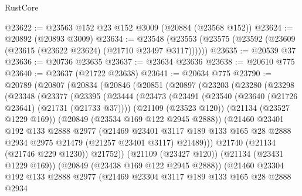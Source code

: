 \begin{lexlean}{RustCore}
\begin{coremodule}
@23622 := @23563 @152 @23 @152 @3009 (@20884 (@23568 @152))
@23624 := @20892 (@20893 @3009)
@23634 := @23548 (@23553 (@23575 (@23592 (@23609 (@23615 (@23622 @23624) (@21710 @23497 @3117))))))
@23635 := @20539 @37
@23636 := @20736 @23635
@23637 := @23634 @23636
@23638 := @20610 @775
@23640 := @23637 (@21722 @23638)
@23641 := @20634 @775
@23790 := @20789
    (@20807
      (@20834
        (@20846
          (@20851
            (@20897
              (@23203
                (@23280
                  (@23298
                    (@23348
                      (@23377
                        (@23395
                          (@23444
                            (@23473
                              (@23491
                                (@23540 (@23640 (@21726 @23641) (@21731 (@21733 @37))))
                                (@21109 (@23523 @120))
                                (@21134 (@23527 @1229 @169))
                                (@20849 (@23534 @169 @122 @2945 @2888))
                                (@21460
                                  @23401
                                  @192
                                  @133
                                  @2888
                                  @2977
                                  (@21469
                                    @23401
                                    @3117
                                    @189
                                    @133
                                    @165
                                    @28
                                    @2888
                                    @2934
                                    @2975
                                    @21479
                                    (@21257 @23401 @3117)
                                    @21489)))
                              @21740
                              (@21134 (@21746 @229 @1230))
                              @21752))
                          (@21109 (@23427 @120))
                          (@21134 (@23431 @1229 @169))
                          (@20849 (@23438 @169 @122 @2945 @2888))
                          (@21460
                            @23304
                            @192
                            @133
                            @2888
                            @2977
                            (@21469
                              @23304
                              @3117
                              @189
                              @133
                              @165
                              @28
                              @2888
                              @2934

\end{coremodule}
\end{lexlean}
